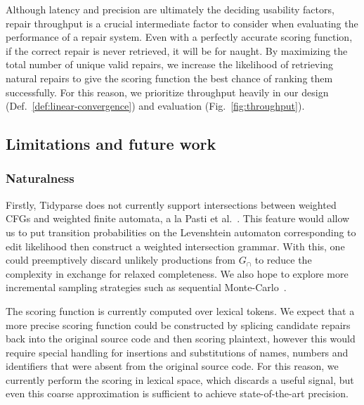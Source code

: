 \documentclass[runningheads]{llncs}
\begin{document}
   Although latency and precision are ultimately the deciding usability factors, repair throughput is a crucial intermediate factor to consider when evaluating the performance of a repair system. Even with a perfectly accurate scoring function, if the correct repair is never retrieved, it will be for naught. By maximizing the total number of unique valid repairs, we increase the likelihood of retrieving natural repairs to give the scoring function the best chance of ranking them successfully. For this reason, we prioritize throughput heavily in our design (Def.~\ref{def:linear-convergence}) and evaluation (Fig.~\ref{fig:throughput}).

  \subsection{Limitations and future work}


  \subsubsection{Naturalness}

  Firstly, Tidyparse does not currently support intersections between weighted CFGs and weighted finite automata, a la Pasti et al.~\cite{pasti2023intersection}. This feature would allow us to put transition probabilities on the Levenshtein automaton corresponding to edit likelihood then construct a weighted intersection grammar. With this, one could preemptively discard unlikely productions from $G_\cap$ to reduce the complexity in exchange for relaxed completeness. We also hope to explore more incremental sampling strategies such as sequential Monte-Carlo~\cite{lew2023sequential}.

  The scoring function is currently computed over lexical tokens. We expect that a more precise scoring function could be constructed by splicing candidate repairs back into the original source code and then scoring plaintext, however this would require special handling for insertions and substitutions of names, numbers and identifiers that were absent from the original source code. For this reason, we currently perform the scoring in lexical space, which discards a useful signal, but even this coarse approximation is sufficient to achieve state-of-the-art precision.
\end{document}
